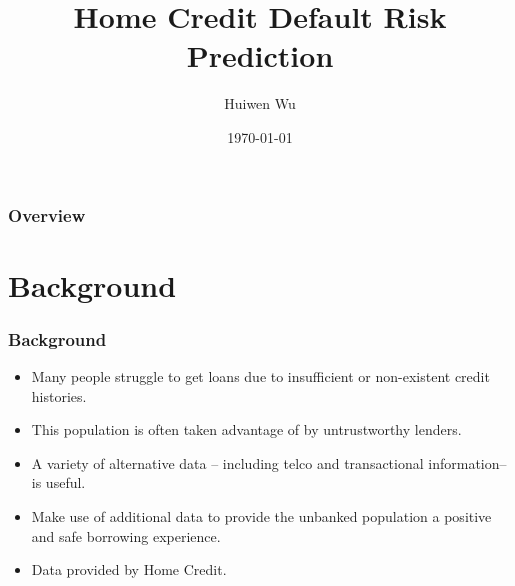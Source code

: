 \documentclass{beamer}
\title{Home Credit Default Risk Prediction} %
\author{Huiwen Wu} %
\institute[UCI] %
{
University of California, Irvine \\ %
\medskip
\textit{huiwenw@uci.edu} %
}
\date{\today} %
\begin{document}
\begin{frame}
\titlepage %
\end{frame}

\begin{frame}
\frametitle{Overview} %
\tableofcontents %
\end{frame}


\section{Background} %


\begin{frame}
\frametitle{Background}

\begin{itemize}
\item Many people struggle to get loans due to insufficient or non-existent credit histories. 
\item This population is often taken advantage of by untrustworthy lenders. 
\item A variety of alternative data -- including telco and transactional information-- is useful. 
\item Make use of additional data to provide the unbanked population a positive and safe borrowing experience. 
\item Data provided by Home Credit. 
\end{itemize}
\end{frame}
\end{document}
